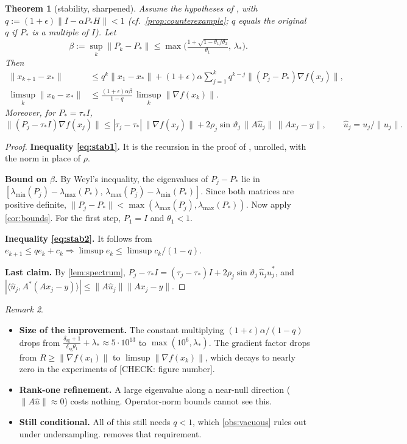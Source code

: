 \documentclass[11pt]{article}
\newtheorem{theorem}{Theorem}[section]
\theoremstyle{definition}
\theoremstyle{remark}
\newtheorem{remark}[theorem]{Remark}
\newcommand{\inner}[2]{\langle #1,#2\rangle}
\newcommand{\norm}[1]{\lVert #1\rVert}
\newcommand{\lmin}{\lambda_{\min}}
\newcommand{\lmax}{\lambda_{\max}}
\newcommand{\dsg}{\delta_{\mathrm{sg}}}
\newcommand{\chk}[1]{\textcolor{red!70!black}{[CHECK: #1]}}
\begin{document}
\begin{theorem}[stability, sharpened]\label{thm:stability}
Assume the hypotheses of \cite[Thm.~2]{hong2024p2np}, with $q:=(1+\epsilon)\norm{I-\alpha P_*H}<1$
(cf.\ \cref{prop:counterexample}; $q$ equals the original $q$ if $P_*$ is a multiple of $I$). Let
\[
\beta:=\sup_k\norm{P_k-P_*}\leq\max\Big(\tfrac{1+\sqrt{1-\theta_1/\theta_2}}{\theta_1},\,\lambda_*\Big).
\]
Then
\begin{align}
  \norm{x_{k+1}-x_*}&\leq q^k\norm{x_1-x_*}+(1+\epsilon)\alpha\sum_{j=1}^{k}q^{k-j}\norm{(P_j-P_*)\nabla f(x_j)},\label{eq:stab1}\\
  \limsup_k\norm{x_k-x_*}&\leq\frac{(1+\epsilon)\alpha\beta}{1-q}\,\limsup_k\norm{\nabla f(x_k)} .\label{eq:stab2}
\end{align}
Moreover, for $P_*=\tau_*I$,
\[
\norm{(P_j-\tau_*I)\nabla f(x_j)}\leq|\tau_j-\tau_*|\,\norm{\nabla f(x_j)}+2\rho_j\sin\vartheta_j\,\norm{A\hat u_j}\,\norm{Ax_j-y},
\qquad \hat u_j=u_j/\norm{u_j}.
\]
\end{theorem}
\begin{proof}
\textbf{Inequality \eqref{eq:stab1}.} It is the recursion in the proof of \cite[Thm.~2]{hong2024p2np}, unrolled,
with the norm in place of $\rho$.

\textbf{Bound on $\beta$.} By Weyl's inequality, the eigenvalues of $P_j-P_*$ lie in
$[\lmin(P_j)-\lmax(P_*),\,\lmax(P_j)-\lmin(P_*)]$. Since both matrices are positive definite,
$\norm{P_j-P_*}<\max(\lmax(P_j),\lmax(P_*))$. Now apply \cref{cor:bounds}. For the first step, $P_1=I$ and
$\theta_1<1$.

\textbf{Inequality \eqref{eq:stab2}.} It follows from $e_{k+1}\leq qe_k+c_k\Rightarrow\limsup e_k\leq\limsup c_k/(1-q)$.

\textbf{Last claim.} By \cref{lem:spectrum}, $P_j-\tau_*I=(\tau_j-\tau_*)I+2\rho_j\sin\vartheta_j\,\hat u_j\hat u_j^*$, and
$|\inner{\hat u_j}{A^*(Ax_j-y)}|\leq\norm{A\hat u_j}\norm{Ax_j-y}$.
\end{proof}

\begin{remark}
\begin{itemize}
\item \textbf{Size of the improvement.} The constant multiplying $(1+\epsilon)\alpha/(1-q)$ drops from
  $\frac{\dsg+1}{\dsg\theta_1}+\lambda_*\approx5\cdot10^{13}$ to $\max(10^6,\lambda_*)$. The gradient factor
  drops from $R\geq\norm{\nabla f(x_1)}$ to $\limsup\norm{\nabla f(x_k)}$, which decays to nearly zero in the
  experiments of \cite[Fig.~7]{hong2024p2np} \chk{figure number}.
\item \textbf{Rank-one refinement.} A large eigenvalue along a near-null direction ($\norm{A\hat u}\approx0$)
  costs nothing. Operator-norm bounds cannot see this.
\item \textbf{Still conditional.} All of this still needs $q<1$, which \cref{obs:vacuous} rules out under
  undersampling.  removes that requirement.
\end{itemize}
\end{remark}
\end{document}
